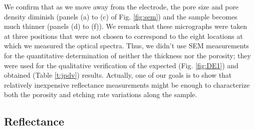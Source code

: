\documentclass[review,sort&compress]{cas-sc}
\begin{document}
We confirm that as we move away from the electrode, the pore
size and pore density diminish (panels (a) to (c) of
Fig. \ref{fig:sem}) and the sample becomes much thinner (panels (d) to
(f)). We remark that these micrographs were taken at three positions
that were not chosen to correspond to the eight locations at which we measured the
optical spectra. Thus, we didn't use SEM measurements for the quantitative
determination of neither the thickness nor the porosity; they were used
for the qualitative verification of the expected (Fig. \ref{fig:DE1})
and obtained (Table \ref{t:jpdv}) results. Actually, one of our
goals is to show that relatively inexpensive reflectance
measurements might be enough to characterize both the porosity and
etching rate variations along the sample.


\subsection{Reflectance}\label{sec:R}
\end{document}
